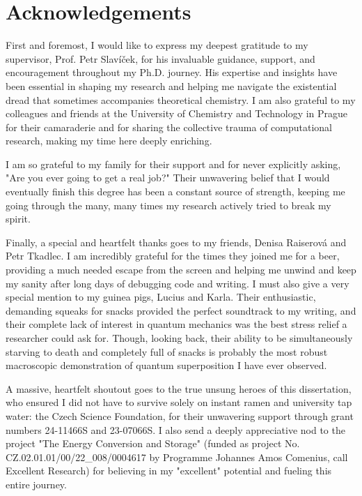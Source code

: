 \chapter*{Acknowledgements}
First and foremost, I would like to express my deepest gratitude to my supervisor, Prof. Petr Slavíček, for his invaluable guidance, support, and encouragement throughout my Ph.D. journey. His expertise and insights have been essential in shaping my research and helping me navigate the existential dread that sometimes accompanies theoretical chemistry. I am also grateful to my colleagues and friends at the University of Chemistry and Technology in Prague for their camaraderie and for sharing the collective trauma of computational research, making my time here deeply enriching.

I am so grateful to my family for their support and for never explicitly asking, "Are you ever going to get a real job?" Their unwavering belief that I would eventually finish this degree has been a constant source of strength, keeping me going through the many, many times my research actively tried to break my spirit.

Finally, a special and heartfelt thanks goes to my friends, Denisa Raiserová and Petr Tkadlec. I am incredibly grateful for the times they joined me for a beer, providing a much needed escape from the screen and helping me unwind and keep my sanity after long days of debugging code and writing. I must also give a very special mention to my guinea pigs, Lucius and Karla. Their enthusiastic, demanding squeaks for snacks provided the perfect soundtrack to my writing, and their complete lack of interest in quantum mechanics was the best stress relief a researcher could ask for. Though, looking back, their ability to be simultaneously starving to death and completely full of snacks is probably the most robust macroscopic demonstration of quantum superposition I have ever observed.

A massive, heartfelt shoutout goes to the true unsung heroes of this dissertation, who ensured I did not have to survive solely on instant ramen and university tap water: the Czech Science Foundation, for their unwavering support through grant numbers 24-11466S and 23-07066S. I also send a deeply appreciative nod to the project "The Energy Conversion and Storage" (funded as project No. CZ.02.01.01/00/22\_008/0004617 by Programme Johannes Amos Comenius, call Excellent Research) for believing in my "excellent" potential and fueling this entire journey.
